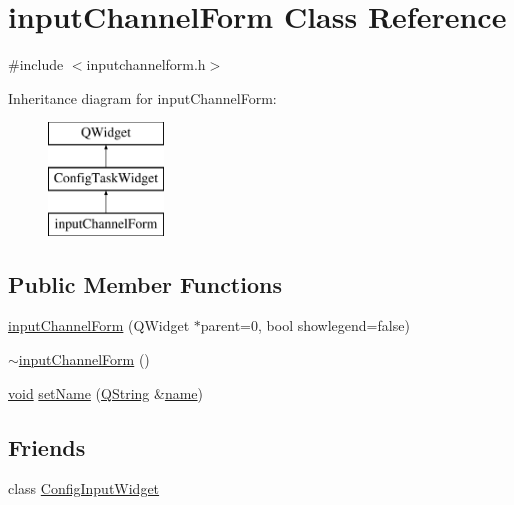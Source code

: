 \hypertarget{classinput_channel_form}{\section{input\-Channel\-Form Class Reference}
\label{classinput_channel_form}
}


{\ttfamily \#include $<$inputchannelform.\-h$>$}

Inheritance diagram for input\-Channel\-Form\-:\begin{figure}[H]
\begin{center}
\leavevmode
\includegraphics[height=3.000000cm]{classinput_channel_form}
\end{center}
\end{figure}
\subsection*{Public Member Functions}
\begin{DoxyCompactItemize}
\item 
\hyperlink{classinput_channel_form_a58524c5a5507c9459ab6caab1f1a49e8}{input\-Channel\-Form} (Q\-Widget $\ast$parent=0, bool showlegend=false)
\item 
\hyperlink{classinput_channel_form_ad20dfc97906fb50e1be3ab969ff22875}{$\sim$input\-Channel\-Form} ()
\item 
\hyperlink{group___u_a_v_objects_plugin_ga444cf2ff3f0ecbe028adce838d373f5c}{void} \hyperlink{classinput_channel_form_ada1f4f0465faa839c8c541b18ae01704}{set\-Name} (\hyperlink{group___u_a_v_objects_plugin_gab9d252f49c333c94a72f97ce3105a32d}{Q\-String} \&\hyperlink{glext_8h_ad977737dfc9a274a62741b9500c49a32}{name})
\end{DoxyCompactItemize}
\subsection*{Friends}
\begin{DoxyCompactItemize}
\item 
class \hyperlink{classinput_channel_form_a2a08d48cca33c79f7765524beaac4767}{Config\-Input\-Widget}
\end{DoxyCompactItemize}
